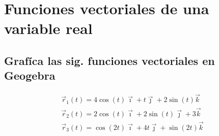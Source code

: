 \documentclass[letterpaper, 12pt]{article}
\begin{document}
\setcounter{page}{1}
\thispagestyle{fancy}
\section*{Funciones vectoriales de una variable real}
\subsection*{Grafíca las sig. funciones vectoriales en Geogebra}
\[\begin{matrix}
    \vec{r}_1(t)=4\cos (t)\vec{\imath}+t\vec{\jmath}+2\sin (t)\vec{k}\\
    \vec{r}_2(t)=2\cos (t)\vec{\imath}+2\sin (t)\vec{\jmath}+3\vec{k}\\
    \vec{r}_3(t)=\cos (2t) \vec{\imath}+4t\vec{\jmath}+\sin (2t)\vec{k}
\end{matrix}\]
\end{document}
